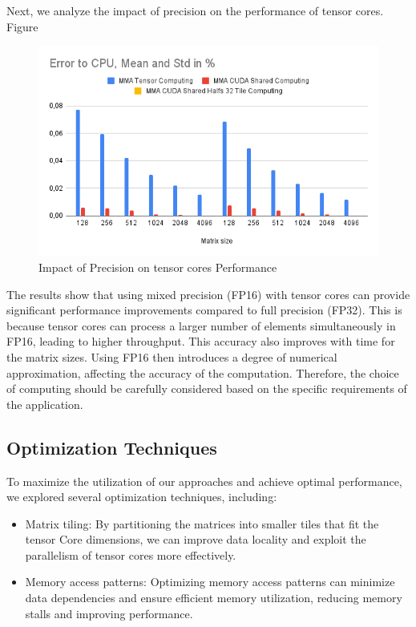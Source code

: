 \documentclass[conference]{IEEEtran}
\begin{document}
  Next, we analyze the impact of precision on the performance of tensor cores. Figure %
  
  \begin{figure}[htbp]
    \centering
    \includegraphics[scale=0.38]{figures/Error to CPU.png}
    \caption{Impact of Precision on tensor cores Performance}
    \label{fig:precision-impact}
  \end{figure}
  
  The results show that using mixed precision (FP16) with tensor cores can provide significant performance improvements compared to full precision (FP32).
  This is because tensor cores can process a larger number of elements simultaneously in FP16,
  leading to higher throughput. This accuracy also improves with time for the matrix sizes.
  Using FP16 then introduces a degree of numerical approximation, affecting the accuracy of the computation.
  Therefore, the choice of computing should be carefully considered based on the specific
  requirements of the application.
  
  \subsection{Optimization Techniques}\label{sec:optimization-techniques}
  
  To maximize the utilization of our approaches and achieve optimal performance, we explored several 
  optimization techniques, including:
  
  \begin{itemize}
    \item Matrix tiling: By partitioning the matrices
    into smaller tiles that fit the tensor Core dimensions, we can improve data locality 
    and exploit the parallelism of tensor cores more effectively.
    \item Memory access patterns: Optimizing memory access patterns can minimize data 
    dependencies and ensure efficient memory utilization, reducing memory stalls and improving 
    performance.
    
  \end{itemize}
  
\end{document}
